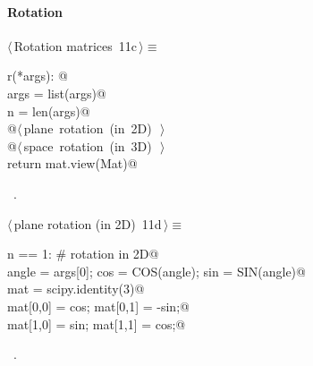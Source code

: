 \documentclass[11pt,oneside]{article}	%
\begin{document}
\paragraph{Rotation}
\begin{flushleft} \small \label{scrap23}
\protect{}$\langle\,$Rotation matrices\nobreak\ {\footnotesize 11c}$\,\rangle\equiv$
\vspace{-1ex}
\begin{list}{}{} \item
\mbox{}\verb@def r(*args): @\\
\mbox{}\verb@   args = list(args)@\\
\mbox{}\verb@   n = len(args)@\\
\mbox{}\verb@   @\hbox{$\langle\,$plane rotation (in 2D)\nobreak\ {\footnotesize {}}$\,\rangle$}\verb@@\\
\mbox{}\verb@   @\hbox{$\langle\,$space rotation (in 3D)\nobreak\ {\footnotesize {}}$\,\rangle$}\verb@@\\
\mbox{}\verb@   return mat.view(Mat)@\\
\mbox{}\verb@@{\NWsep}
\end{list}
\vspace{-1ex}
\footnotesize\addtolength{\baselineskip}{-1ex}
\begin{list}{}{\setlength{\itemsep}{-\parsep}\setlength{\itemindent}{-\leftmargin}}
\item \NWtxtMacroRefIn\ .
\end{list}
\end{flushleft}
\begin{flushleft} \small \label{scrap24}
\protect{}$\langle\,$plane rotation (in 2D)\nobreak\ {\footnotesize 11d}$\,\rangle\equiv$
\vspace{-1ex}
\begin{list}{}{} \item
\mbox{}\verb@if n == 1: # rotation in 2D@\\
\mbox{}\verb@   angle = args[0]; cos = COS(angle); sin = SIN(angle)@\\
\mbox{}\verb@   mat = scipy.identity(3)@\\
\mbox{}\verb@   mat[0,0] = cos;   mat[0,1] = -sin;@\\
\mbox{}\verb@   mat[1,0] = sin;   mat[1,1] = cos;@\\
\mbox{}\verb@@{\NWsep}
\end{list}
\vspace{-1ex}
\footnotesize\addtolength{\baselineskip}{-1ex}
\begin{list}{}{\setlength{\itemsep}{-\parsep}\setlength{\itemindent}{-\leftmargin}}
\item \NWtxtMacroRefIn\ .
\end{list}
\end{flushleft}
\end{document}
